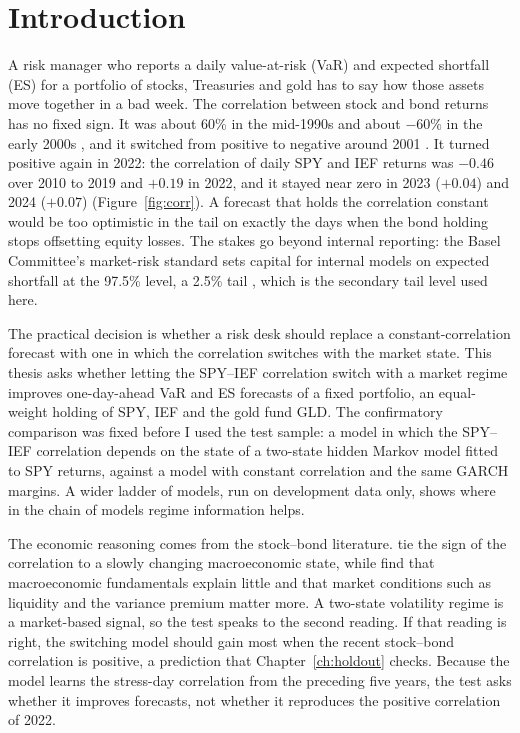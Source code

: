 \section{Introduction}\label{ch:intro}

A risk manager who reports a daily value-at-risk (VaR) and expected shortfall (ES) for a portfolio of stocks, Treasuries and gold has to say how those assets move together in a bad week. The correlation between stock and bond returns has no fixed sign. It was about 60\% in the mid-1990s and about $-60\%$ in the early 2000s \citep{baele2010}, and it switched from positive to negative around 2001 \citep{campbell2020}. It turned positive again in 2022: the correlation of daily SPY and IEF returns was $-0.46$ over 2010 to 2019 and $+0.19$ in 2022, and it stayed near zero in 2023 ($+0.04$) and 2024 ($+0.07$) (Figure~\ref{fig:corr}). A forecast that holds the correlation constant would be too optimistic in the tail on exactly the days when the bond holding stops offsetting equity losses. The stakes go beyond internal reporting: the Basel Committee's market-risk standard sets capital for internal models on expected shortfall at the 97.5\% level, a 2.5\% tail \citep{bcbs2019}, which is the secondary tail level used here.

The practical decision is whether a risk desk should replace a constant-correlation forecast with one in which the correlation switches with the market state. This thesis asks whether letting the SPY--IEF correlation switch with a market regime improves one-day-ahead VaR and ES forecasts of a fixed portfolio, an equal-weight holding of SPY, IEF and the gold fund GLD. The confirmatory comparison was fixed before I used the test sample: a model in which the SPY--IEF correlation depends on the state of a two-state hidden Markov model fitted to SPY returns, against a model with constant correlation and the same GARCH margins. A wider ladder of models, run on development data only, shows where in the chain of models regime information helps.

The economic reasoning comes from the stock--bond literature. \citet{campbell2020} tie the sign of the correlation to a slowly changing macroeconomic state, while \citet{baele2010} find that macroeconomic fundamentals explain little and that market conditions such as liquidity and the variance premium matter more. A two-state volatility regime is a market-based signal, so the test speaks to the second reading. If that reading is right, the switching model should gain most when the recent stock--bond correlation is positive, a prediction that Chapter~\ref{ch:holdout} checks. Because the model learns the stress-day correlation from the preceding five years, the test asks whether it improves forecasts, not whether it reproduces the positive correlation of 2022.

